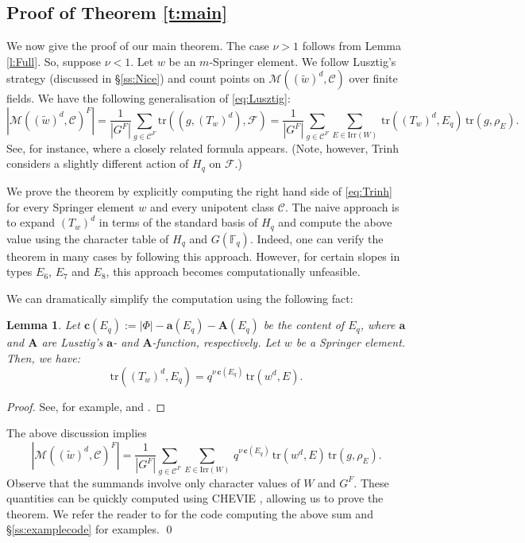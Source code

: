 \documentclass[11pt]{amsart}
\newtheorem{lem}[thm]{Lemma}
\theoremstyle{definition}
\newcommand{\cC}{\mathcal{C}}
\newcommand{\cM}{\mathcal{M}}
\newcommand{\Fq}{\mathbb{F}_q}
\newcommand{\cF}{\mathcal{F}}
\begin{document}
\subsection{Proof of Theorem \ref{t:main}} 
We now give the proof of our main theorem. The case $\nu>1$ follows from Lemma \ref{l:Full}. So, suppose $\nu<1$. Let $w$ be an $m$-Springer element. 
We follow Lusztig's strategy (discussed in \S \ref{ss:Nice}) and count points on $\cM((\widetilde{w})^d, \cC)$ over finite fields.   
We have the following generalisation of \eqref{eq:Lusztig}: 
\begin{equation} \label{eq:Trinh}
|\cM((\widetilde{w})^d, \cC)^F|
= \frac{1}{|G^F|} \sum_{g\in \cC^F} \mathrm{tr}((g, (T_w)^d), \cF) 
= \frac{1}{|G^F|} \sum_{g\in \cC^F}  \sum_{E\in \mathrm{Irr}(W)}\,  \mathrm{tr}((T_w)^d, E_q)\, \mathrm{tr}(g, \rho_E).
\end{equation} 
See, for instance,  \cite[Lemma 8.5.7]{Trinh} where a closely related formula appears. (Note, however, Trinh considers a slightly different action of $H_q$ on $\cF$.)

 We prove the theorem by explicitly computing the right hand side of \eqref{eq:Trinh} for every Springer element $w$ and every unipotent class $\cC$. The naive approach is to expand $(T_w)^d$ in terms of the standard basis of $H_q$ and compute the above value using the character table of $H_q$ and $G(\Fq)$. Indeed, one can verify the theorem in many cases by following this approach. However, for certain slopes in types $E_6$, $E_7$ and $E_8$, this approach becomes computationally unfeasible. 

We can dramatically simplify the computation using the following fact: 
\begin{lem} 
Let $\mathbf{c}(E_q):=|\Phi| - \mathbf{a}(E_q) - \mathbf{A}(E_q)$ be the content of $E_q$, where $\mathbf{a}$ and $\mathbf{A}$ are Lusztig's $\mathbf{a}$- and $\mathbf{A}$-function, respectively. Let $w$ be a Springer element. Then, we have: 
\[
\mathrm{tr}((T_w)^d, E_q) = q^{\nu\, \mathbf{c}(E_q)}\, \mathrm{tr}(w^d, E).
\] 
\end{lem} 

\begin{proof} 
See, for example, \cite[Corollary 4.20]{BM} and \cite[Corollary 9.2.2]{Trinh}. 
\end{proof} 

The above discussion implies  
\begin{equation} 
|\cM((\widetilde{w})^d, \cC)^F|
= \frac{1}{|G^F|} \sum_{g\in \cC^F}  \sum_{E\in \mathrm{Irr}(W)}\,  q^{\nu\, \mathbf{c}(E_q)}\, \mathrm{tr}(w^d, E)\, \mathrm{tr}(g, \rho_E). 
\end{equation} 
Observe that the summands involve only character values of $W$ and $G^F$. These quantities can be quickly computed using CHEVIE \cite{Michel}, allowing us to prove the theorem. 
We refer the reader to \cite{Whitbread} for the code computing the above sum and \S\ref{ss:examplecode} for examples.  \qed
\end{document}
